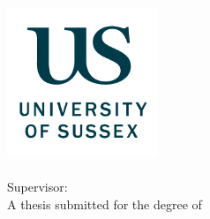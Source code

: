 \thispagestyle{empty}
\begin{center}
  \includegraphics[width=4.5cm]{figures/uos_logo.png}
  \vfill
  \huge\textbf{\ttitle}\\
  \Large\textbf{\ssubtitle}
  \vskip 1cm
  \Large\textbf{\aauthor\\}
  \vskip 3cm
  Supervisor: \ssupervisor\\
  \vfill
  A thesis submitted for the degree of\\
  \textit{\ddegree}
  \vfill
  \sschool\\
  \uuniversity\\
  \pplace\\
  \ddate%
\end{center}

